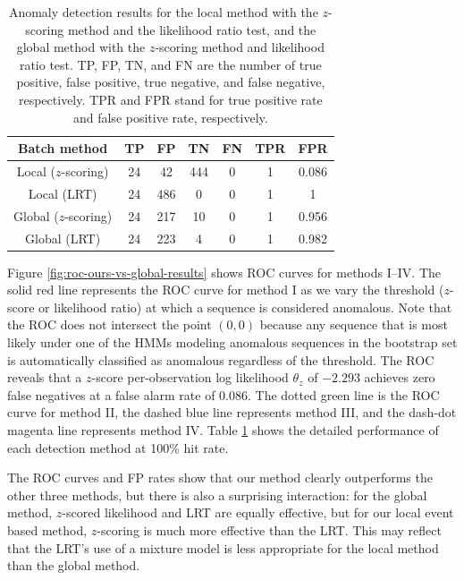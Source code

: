 \begin{table}[t]
  \caption[Anomaly detection results for the local method with the
    $z$-scoring method and the likelihood ratio test, and the global
    method with the $z$-scoring method and likelihood ratio
    test.]{\small Anomaly detection results for the local method with
    the $z$-scoring method and the likelihood ratio test, and the
    global method with the $z$-scoring method and likelihood ratio
    test. TP, FP, TN, and FN are the number of true positive, 
    false positive, true negative, and false negative, respectively. 
    TPR and FPR stand for true positive rate and false positive rate, 
    respectively.}
  \begin{center}
    \begin{tabular}{c|c|c|c|c|c|c}
      \hline Batch method & TP & FP & TN & FN & TPR & FPR \\ \hline \hline
      Local ($z$-scoring) & 24 & 42 & 444 & 0 & 1 & 0.086 \\ \hline
      Local (LRT) & 24 & 486 & 0 & 0 & 1 & 1 \\ \hline 
      Global ($z$-scoring) & 24 & 217 & 10 & 0 & 1 & 0.956 \\ \hline 
      Global (LRT) & 24 & 223 & 4 & 0 & 1 & 0.982 \\ \hline
    \end{tabular}
  \end{center}
  \label{tab:hmm-based-detection-results}
\end{table} 

Figure \ref{fig:roc-ours-vs-global-results} shows ROC curves for
methods I--IV.  The solid red line represents the ROC curve for method
I as we vary the threshold ($z$-score or likelihood ratio) at which a
sequence is considered anomalous. Note that the ROC does not intersect
the point $(0, 0)$ because any sequence that is most likely under one
of the HMMs modeling anomalous sequences in the bootstrap set is
automatically classified as anomalous regardless of the threshold. The
ROC reveals that a $z$-score per-observation log likelihood $\theta_z$
of $-2.293$ achieves zero false negatives at a false alarm rate of
0.086. The dotted green line is the ROC curve for method II, the
dashed blue line represents method III, and the dash-dot magenta line
represents method IV.  Table
\ref{tab:hmm-based-detection-results} shows the detailed performance
of each detection method at 100\% hit rate.

The ROC curves and FP rates show that our method clearly outperforms
the other three methods, but there is also a surprising interaction:
for the global method, $z$-scored likelihood and LRT are equally
effective, but for our local event based method, $z$-scoring is much
more effective than the LRT.  This may reflect that the LRT's use of a
mixture model is less appropriate for the local method than the global
method.

